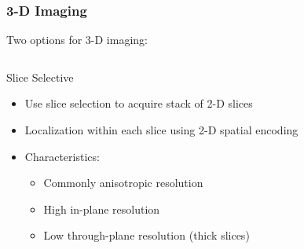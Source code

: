 \begin{frame}
	\frametitle{3-D Imaging}
	
	Two options for 3-D imaging:
	
	\vspace{-2ex}
	
	\begin{columns}[t,onlytextwidth]

	    \begin{block}{Slice Selective}
	        \begin{itemize}
	            \small
	            \item Use slice selection to acquire stack of 2-D slices
				\item Localization within each slice using 2-D spatial encoding
				\item Characteristics:
				\begin{itemize}
					\item Commonly anisotropic resolution
					\item High in-plane resolution
					\item Low through-plane resolution (thick slices)
				\end{itemize}
	        \end{itemize}
	    \end{block}


	\end{columns}
\end{frame}


